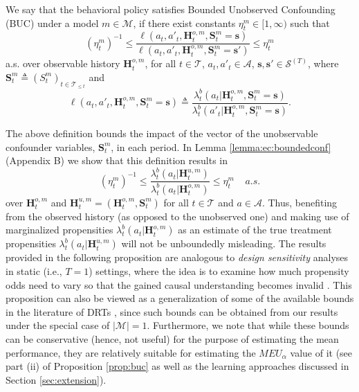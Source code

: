 \documentclass[opre,nonblindrev]{informs2}%
\newcommand{\teq}{\triangleq}
\newcommand{\1}{\hbox{\rm 1\kern-.35em 1}}
\newcommand{\MS}{\mathscr S}
\newcommand{\MA}{\mathscr A}
\newcommand{\MT}{\mathscr T}
\newcommand{\MM}{\mathscr M}
\newcommand{\bH}{\mathbf{H}}
\newcommand{\bS}{\mathbf{S}}
\newcommand{\bs}{\mathbf{s}}
\begin{document}
\begin{definition}\label{def:boundedconf} We say that the behavioral policy satisfies Bounded Unobserved Confounding (BUC) under  a model $m\in\MM$, if there exist constants $\eta_t^m\in[1,\infty)$ such that
\begin{equation}
(\eta^m_t)^{-1}\leq\frac{\ell (a_t,a'_t, \bH_t^{o,m}, \bS^m_t=\bs)}{\ell (a_t,a'_t, \bH_t^{o,m}, \bS^m_t=\bs')}\leq \eta^m_t
\end{equation}
a.s. over observable history $\bH_t^{o,m}$,   for all $t\in\MT$, $a_t,a'_t\in \MA$, $\bs, \bs'\in\MS^{(T)}$, where $\bS^m_t\teq(S^m_t)_{t\in\MT_{\leq t}}$ and
$$ \ell (a_t,a'_t, \bH_t^{o,m},  \bS^m_t=\bs)\teq \frac{\lambda^b_t (a_t|\bH_t^{o,m}, \bS^m_t=\bs)}{\lambda^b_t (a'_t|\bH_t^{o,m},\bS^m_t=\bs)}.$$
\end{definition}
The above definition bounds the impact of the vector of the unobservable confounder variables, $\bS^m_t$,  in each period. In Lemma \ref{lemma:ec:boundedconf} (Appendix B) we show that this definition results in
\begin{equation}\label{eq:BUCEquivalent}
(\eta^m_t)^{-1}\leq\frac{\lambda^b_t (a_t|\bH_t^{u,m})}{\lambda^b_t (a_t|\bH_t^{o,m})}\leq \eta^m_t\ \ \ \ \ a.s.
\end{equation}
over $\bH_t^{o,m}$ and $\bH_t^{u,m}=(\bH_t^{o,m}, \bS^m_t)$ for all $t\in\MT$ and $a\in\MA$. Thus, benefiting from the observed history (as opposed to the unobserved one) and making use of marginalized  propensities $\lambda^b_t (a_t|\bH_t^{o,m})$
as an estimate of  the true treatment propensities $\lambda^b_t (a_t|\bH_t^{u,m})$ will not be unboundedly misleading. The results provided in the following proposition   are analogous to {\em design sensitivity} analyses \citep[see, e.g.,][]{Rosenbaum2010} in static (i.e., $T=1$) settings, where the idea is to examine how much propensity odds need to vary so that the gained causal understanding becomes  invalid \citep[see, also, ][]{Kallus2020Conf, Kallus2021}. This proposition can also be viewed as a generalization of some of the available bounds in the literature of DRTs \citep[see, e.g., Lemma 2 of ][]{Namkoong2020}, since such bounds can be obtained from our results under the special case of $|\MM|=1$.  Furthermore, we note that while these bounds can be conservative (hence, not useful) for the purpose of estimating the mean performance, they are relatively suitable for estimating the $MEU_\alpha$ value of it (see part (ii) of  Proposition \ref{prop:buc} as well as the learning approaches discussed in Section \ref{sec:extension}).
\end{document}
